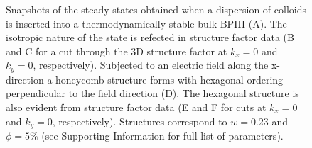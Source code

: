 \documentclass[12pt]{article}
\begin{document}
\begin{figure}
{\begin{minipage}[t]{0.17\textwidth}
\end{minipage}
}
\caption{Snapshots of the steady states obtained when a dispersion of colloids is inserted into a thermodynamically stable bulk-BPIII (A). The isotropic nature of the state is refected in structure factor data (B and C for a cut through the 3D structure factor at $k_x=0$ and $k_y=0$, respectively). Subjected to an electric field along the x-direction a honeycomb structure forms with hexagonal ordering perpendicular to the field direction (D). The hexagonal structure is also evident from structure factor data (E and F for cuts at $k_x=0$ and $k_y=0$, respectively).     
Structures correspond to $w=0.23$ and $\phi=5\%$ (see Supporting Information
for full list of parameters). }
\end{figure}
\end{document}
